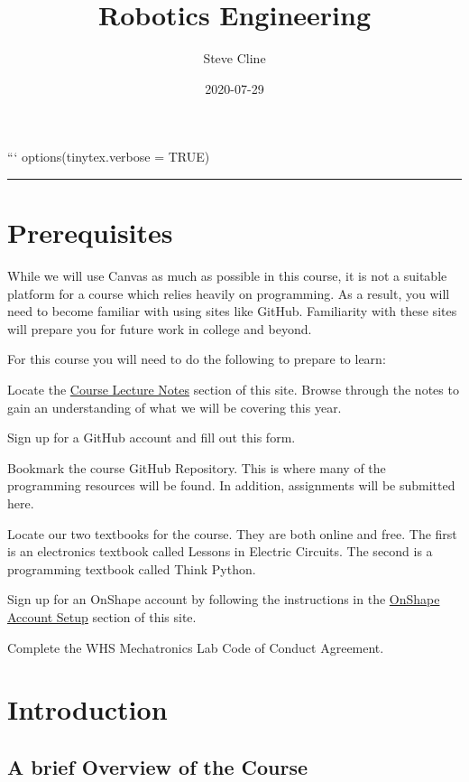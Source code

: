 \documentclass[
]{book}
\title{Robotics Engineering}
\author{Steve Cline}
\date{2020-07-29}
\begin{document}
\maketitle

{
\setcounter{tocdepth}{1}
\tableofcontents
}
```
options(tinytex.verbose = TRUE)

\begin{center}\rule{0.5\linewidth}{0.5pt}\end{center}

\hypertarget{prerequisites}{%
\chapter{Prerequisites}\label{prerequisites}}

While we will use Canvas as much as possible in this course, it is not a suitable platform for a course which relies heavily on programming. As a result, you will need to become familiar with using sites like GitHub. Familiarity with these sites will prepare you for future work in college and beyond.

For this course you will need to do the following to prepare to learn:

Locate the \protect\hyperlink{course-lecture-notes}{Course Lecture Notes} section of this site. Browse through the notes to gain an understanding of what we will be covering this year.

Sign up for a GitHub account and fill out this form.

Bookmark the course GitHub Repository. This is where many of the programming resources will be found. In addition, assignments will be submitted here.

Locate our two textbooks for the course. They are both online and free. The first is an electronics textbook called Lessons in Electric Circuits. The second is a programming textbook called Think Python.

Sign up for an OnShape account by following the instructions in the \protect\hyperlink{onshape-account-setup}{OnShape Account Setup} section of this site.

Complete the WHS Mechatronics Lab Code of Conduct Agreement.

\hypertarget{intro}{%
\chapter{Introduction}\label{intro}}

\hypertarget{a-brief-overview-of-the-course}{%
\section{A brief Overview of the Course}\label{a-brief-overview-of-the-course}}
\end{document}
